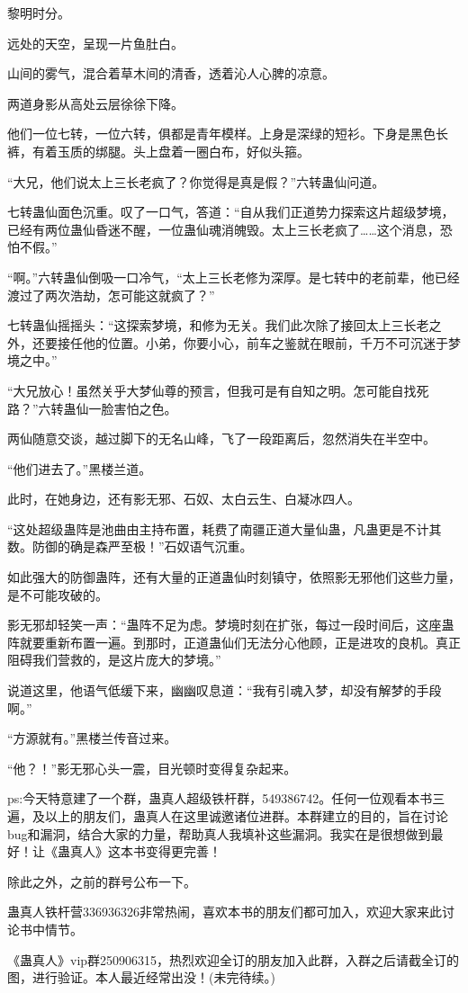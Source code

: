 \begin{this_body}
黎明时分。

远处的天空，呈现一片鱼肚白。

山间的雾气，混合着草木间的清香，透着沁人心脾的凉意。

两道身影从高处云层徐徐下降。

他们一位七转，一位六转，俱都是青年模样。上身是深绿的短衫。下身是黑色长裤，有着玉质的绑腿。头上盘着一圈白布，好似头箍。

“大兄，他们说太上三长老疯了？你觉得是真是假？”六转蛊仙问道。

七转蛊仙面色沉重。叹了一口气，答道：“自从我们正道势力探索这片超级梦境，已经有两位蛊仙昏迷不醒，一位蛊仙魂消魄毁。太上三长老疯了……这个消息，恐怕不假。”

“啊。”六转蛊仙倒吸一口冷气，“太上三长老修为深厚。是七转中的老前辈，他已经渡过了两次浩劫，怎可能这就疯了？”

七转蛊仙摇摇头：“这探索梦境，和修为无关。我们此次除了接回太上三长老之外，还要接任他的位置。小弟，你要小心，前车之鉴就在眼前，千万不可沉迷于梦境之中。”

“大兄放心！虽然关乎大梦仙尊的预言，但我可是有自知之明。怎可能自找死路？”六转蛊仙一脸害怕之色。

两仙随意交谈，越过脚下的无名山峰，飞了一段距离后，忽然消失在半空中。

“他们进去了。”黑楼兰道。

此时，在她身边，还有影无邪、石奴、太白云生、白凝冰四人。

“这处超级蛊阵是池曲由主持布置，耗费了南疆正道大量仙蛊，凡蛊更是不计其数。防御的确是森严至极！”石奴语气沉重。

如此强大的防御蛊阵，还有大量的正道蛊仙时刻镇守，依照影无邪他们这些力量，是不可能攻破的。

影无邪却轻笑一声：“蛊阵不足为虑。梦境时刻在扩张，每过一段时间后，这座蛊阵就要重新布置一遍。到那时，正道蛊仙们无法分心他顾，正是进攻的良机。真正阻碍我们营救的，是这片庞大的梦境。”

说道这里，他语气低缓下来，幽幽叹息道：“我有引魂入梦，却没有解梦的手段啊。”

“方源就有。”黑楼兰传音过来。

“他？！”影无邪心头一震，目光顿时变得复杂起来。

ps:今天特意建了一个群，蛊真人超级铁杆群，549386742。任何一位观看本书三遍，及以上的朋友们，蛊真人在这里诚邀诸位进群。本群建立的目的，旨在讨论bug和漏洞，结合大家的力量，帮助真人我填补这些漏洞。我实在是很想做到最好！让《蛊真人》这本书变得更完善！

除此之外，之前的群号公布一下。

蛊真人铁杆营336936326非常热闹，喜欢本书的朋友们都可加入，欢迎大家来此讨论书中情节。

《蛊真人》vip群250906315，热烈欢迎全订的朋友加入此群，入群之后请截全订的图，进行验证。本人最近经常出没！(未完待续。)

\end{this_body}

